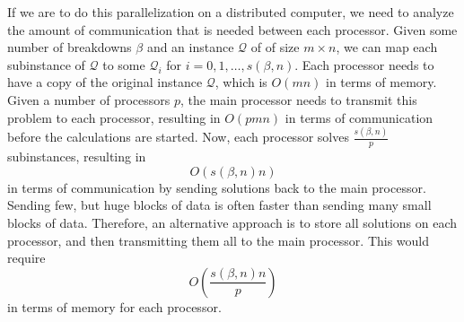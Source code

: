 \documentclass[a4paper,12pt]{report}
\begin{document}
If we are to do this parallelization on a distributed computer, we need to
analyze the amount of communication that is needed between each processor.
Given some number of breakdowns $\beta$ and an instance $\mathcal{Q}$ of of
size $m \times n$, we can map each subinstance of $\mathcal{Q}$ to some
$\mathcal{Q}_i$ for $i=0,1,\ldots,s(\beta, n)$. Each processor needs to
have a copy of the original instance $\mathcal{Q}$, which is $O(mn)$ in terms
of memory. Given a number of processors $p$, the main processor needs to
transmit this problem to each processor, resulting in $O(pmn)$ in terms of
communication before the calculations are started. Now, each
processor solves $\frac{s(\beta, n)}{p}$ subinstances, resulting in
\[
O(s(\beta, n)n)
\]
in terms of communication by sending solutions back to the main processor.
Sending few, but huge blocks of data is often faster than sending many small
blocks of data.
Therefore, an alternative approach is to store all solutions on each processor,
and then transmitting them all to the main processor.
This would require
\[
O\left(\frac{s(\beta, n)n}{p}\right)
\]
in terms of memory for each processor.


{}


\onecolumn

\end{document}
